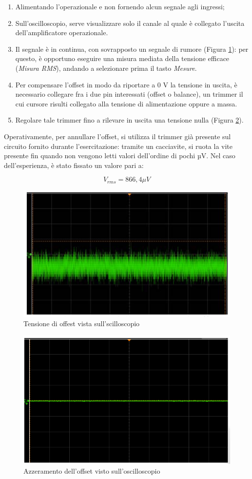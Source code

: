 \begin{enumerate}
    \item Alimentando l’operazionale e non fornendo alcun segnale agli ingressi;
    \item  Sull’oscilloscopio, serve visualizzare solo il canale al quale è collegato l’uscita dell’amplificatore operazionale.
    \item  Il segnale è in continua, con sovrapposto un segnale di rumore (Figura \ref{fig:tensioneOffset}): per questo, è opportuno eseguire una misura mediata della tensione efficace (\textit{Misura RMS}), andando a selezionare prima il tasto \textit{Mesure}.
    \item  Per compensare l’offset in modo da riportare a 0 V la tensione in uscita, è necessario collegare fra i due pin interessati (offset o balance), un trimmer il cui cursore risulti collegato alla tensione di alimentazione oppure a massa.
    \item Regolare tale trimmer fino a rilevare in uscita una tensione nulla (Figura \ref{fig:azzeramentoOffset}). 
\end{enumerate}

Operativamente, per annullare l’offset, si utilizza il trimmer già presente sul circuito fornito durante l’esercitazione: tramite un cacciavite, si ruota la vite presente fin quando non vengono letti valori dell’ordine di pochi µV.
Nel caso dell'esperienza, è stato fissato un valore pari a:

\[V_{rms}=866,4 \mu V\]
\FloatBarrier
\begin{figure}
    \centering
    \includegraphics[width=0.5\linewidth]{Relazione//media/tensioneOffest.png}
    \caption{Tensione di offest vista sull'scilloscopio}
    \label{fig:tensioneOffset}
\end{figure}
\begin{figure}
    \centering
    \includegraphics[width=0.5\linewidth]{Relazione//media/azzeramentoOffset.png}
    \caption{Azzeramento dell'offset visto sull'oscilloscopio}
    \label{fig:azzeramentoOffset}
\end{figure}
\FloatBarrier
